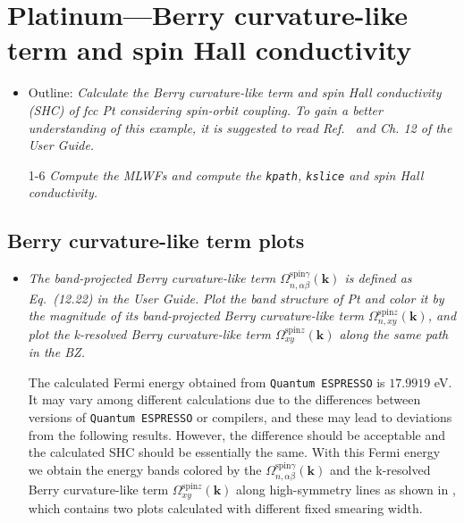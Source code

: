 \section{Platinum---Berry curvature-like term and spin Hall conductivity}
\label{sec29:PtSHC}

\begin{itemize}
	\item Outline: {\it Calculate the Berry curvature-like term and spin Hall conductivity (SHC)
	of fcc Pt considering spin-orbit coupling. To gain a better understanding of this example, it is suggested to read Ref.~ and Ch. 12 of the User Guide.}
\end{itemize}

\begin{itemize}
	\item[1-6] {\it Compute the MLWFs and compute the {\tt kpath}, {\tt kslice} and spin Hall conductivity.} 
\end{itemize}

\subsection*{Berry curvature-like term plots}
\begin{itemize}
	\item {\it The band-projected Berry curvature-like term $\Omega_{n,\alpha\beta}^{\text{spin} \gamma}({\bm k})$ 
		is defined as Eq.~(12.22) in the User Guide.}
	{\it Plot the band structure of Pt and color it 
		by the magnitude of its band-projected Berry curvature-like term $\Omega_{n,xy}^{\text{spin}z}(\bm k)$, 
		and plot the k-resolved Berry curvature-like term $\Omega_{xy}^{\text{spin}z}(\bm k)$ along the 
		same path in the BZ. }

	The calculated Fermi energy obtained from {\tt Quantum ESPRESSO} is $17.9919$ eV. 
	It may vary among different calculations due to the differences between versions of {\tt Quantum ESPRESSO} or compilers, 
	and these may lead to deviations from the following results. 
	However, the difference should be acceptable and the calculated SHC should be essentially the same. 
	With this Fermi energy we obtain the energy bands colored by the 
	$\Omega_{n,\alpha\beta}^{\text{spin} \gamma}({\bm k})$ 
	and the k-resolved Berry curvature-like term 
	$\Omega_{xy}^{\text{spin}z}(\bm k)$ along high-symmetry lines 
	as shown in , which contains two plots calculated with 
	different fixed smearing width.
\end{itemize}


